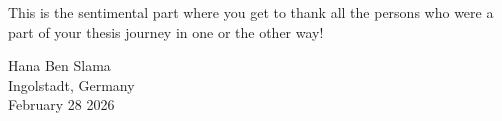 
This is the sentimental part where you get to thank all the persons who were a part of your 
thesis journey in one or the other way!
		
Hana Ben Slama\\
Ingolstadt, Germany\\
February 28 2026